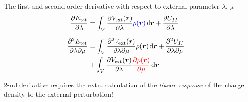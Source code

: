 \begin{frame}
  The first and second order derivative with respect to external parameter
  $\lambda$, $\mu$
   \begin{align}
    \frac{
      \partial E_{\text{tot}}
    }{
      \partial \lambda
    }
    &=
    \int_V
    \frac{
      \partial
      V_{\text{ext}}(\boldsymbol{r})
    }{
      \partial \lambda
    }
    \mathcolor{blue}{\rho(\boldsymbol{r})}
    \,\mathrm{d}\boldsymbol{r}
    +
    \frac{
      \partial
      U_{II}
    }{
      \partial \lambda
    } \label{eq:energy_1st_deriv}
    \\[6pt]
    \frac{
      \partial^2 E_{\text{tot}}
    }{
      \partial \lambda
      \partial \mu
    }
    &=
    \int_V
    \frac{
      \partial^2
      V_{\text{ext}}(\boldsymbol{r})
    }{
      \partial \lambda
      \partial \mu
    }
    \rho(\boldsymbol{r}) \,\mathrm{d}\boldsymbol{r}
    +
    \frac{
      \partial^2 U_{II}
    }{
      \partial \lambda
      \partial \mu
    } \nonumber \\
    & +
    \int_V
    \frac{
      \partial
      V_{\text{ext}}(\boldsymbol{r})
    }{
      \partial \lambda
    }
    \mathcolor{red}{
      \frac{
        \partial
        \rho(\boldsymbol{r})
      }{
        \partial \mu
      }
    }
    \,\mathrm{d}\boldsymbol{r} \label{eq:energy_2nd_deriv}
  \end{align}

  2-nd derivative requires the extra calculation of the \textit{linear response}
  of the charge density to the external perturbation!

\end{frame}

